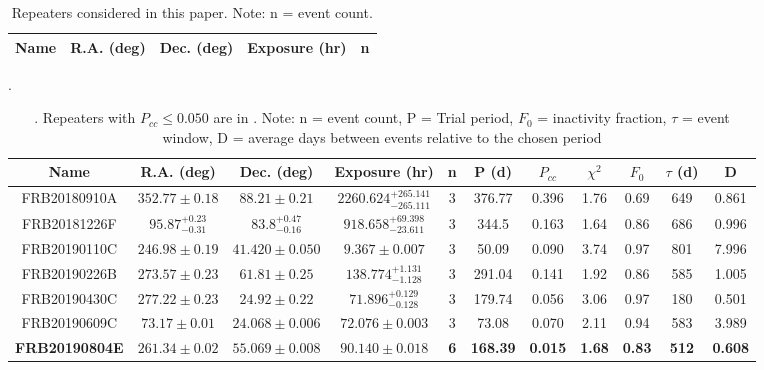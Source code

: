 \begin{table*}
    \centering
    \caption{Repeaters considered in this paper. Note: n = event count.}
    \begin{tabular}{c c c c c}
        \hline
        Name & R.A. (deg) & Dec. (deg) & Exposure (hr) & n\\
        \hline   
        \hline
    \end{tabular}
    \label{table:repeaters}
\end{table*}

\begin{table*}
    \centering
    \caption{. Repeaters with $P_{cc} \leq 0.050$ are in . Note: n = event count, P = Trial period, $F_0$ = inactivity fraction, $\tau$ = event window, D = average days between events relative to the chosen period}.
    \begin{tabular}{c c c c c c c c c c c}
        \hline
        Name & R.A. (deg) & Dec. (deg) & Exposure (hr) & n & P (d) & $P_{cc}$ & $\chi^2$ & $F_0$ & $\tau$ (d) & D\\
        \hline
        FRB20180910A & $352.77 \pm 0.18$ & $88.21 \pm 0.21$ & $2260.624^{+265.141}_{-265.111}$ & 3 & 376.77 & 0.396 & 1.76 & 0.69 & 649 & 0.861\\
        FRB20181226F & $95.87^{+0.23}_{-0.31}$ & $83.8^{+0.47}_{-0.16}$ & $918.658^{+69.398}_{-23.611}$ & 3 & 344.5 & 0.163 & 1.64 & 0.86 & 686 & 0.996\\
        FRB20190110C & $246.98 \pm 0.19$ & $41.420 \pm 0.050$ & $9.367 \pm 0.007$ & 3 & 50.09 & 0.090 & 3.74 & 0.97 & 801 & 7.996\\
        FRB20190226B & $273.57 \pm 0.23$ & $61.81 \pm 0.25$ & $138.774^{+1.131}_{-1.128}$ & 3 & 291.04 & 0.141 & 1.92 & 0.86 & 585 & 1.005\\
        FRB20190430C & $277.22 \pm 0.23$ & $24.92 \pm 0.22$ & $71.896^{+0.129}_{-0.128}$ & 3 & 179.74 & 0.056 & 3.06 & 0.97 & 180 & 0.501\\
        FRB20190609C & $73.17 \pm 0.01$ & $24.068 \pm 0.006$ & $72.076 \pm 0.003$ & 3 & 73.08 & 0.070 & 2.11 & 0.94 & 583 & 3.989\\
        \textbf{FRB20190804E} & $\mathbf{261.34 \pm 0.02}$ & $\mathbf{55.069 \pm 0.008}$ & $\mathbf{90.140 \pm 0.018}$ & \textbf{6} & \textbf{168.39} & \textbf{0.015} & \textbf{1.68} & \textbf{0.83} & \textbf{512} & \textbf{0.608}\\

\end{tabular}
\end{table*}
